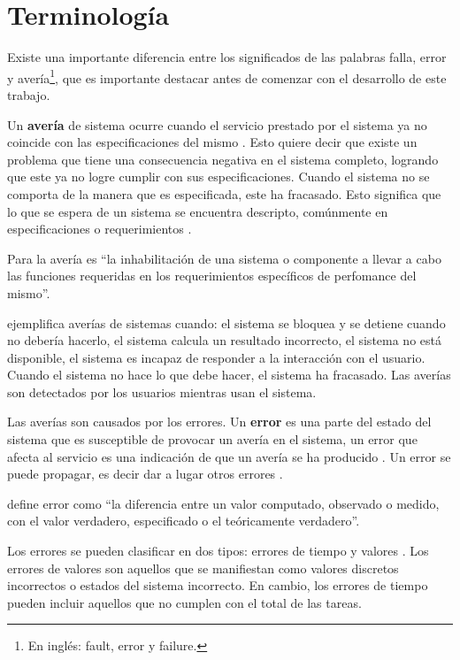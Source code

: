 \section{Terminología}\label{sec:terminologia}
Existe una importante diferencia entre los significados de las palabras falla, error y 
avería\footnote{En inglés: fault, error y failure.}, que es importante destacar antes de comenzar 
con el desarrollo de este trabajo.

Un \textbf{avería} de sistema ocurre cuando el servicio prestado por el sistema ya no coincide con 
las especificaciones del mismo \citep{Hanmer07}. Esto quiere decir que existe un problema que tiene 
una consecuencia negativa en el sistema completo, logrando que este ya no logre cumplir con sus 
especificaciones. Cuando el sistema no se comporta de la manera que es especificada, este ha 
fracasado. Esto significa que lo que se espera de un sistema se encuentra descripto, comúnmente en 
especificaciones o requerimientos \citep{Pullum01}.

Para la \cite{IEEE610.12} avería es ``la inhabilitación de una sistema o componente a llevar a 
cabo las funciones requeridas en los requerimientos específicos de perfomance del mismo''.

\cite{Hanmer07} ejemplifica averías de sistemas cuando: el sistema se bloquea y se detiene cuando no 
debería hacerlo, el sistema calcula un resultado incorrecto, el sistema no está disponible, el 
sistema es incapaz de responder a la interacción con el usuario. Cuando el sistema no hace lo que 
debe hacer, el sistema ha fracasado. Las averías son detectados por los usuarios mientras usan el 
sistema.

Las averías son causados por los errores. Un \textbf{error} es una parte del estado del sistema 
que es susceptible de provocar un avería en el sistema, un error que afecta al servicio es una 
indicación de que un avería se ha producido \citep{Hanmer07}. Un error se puede propagar, es decir 
dar a lugar otros errores \citep{Pullum01}.

\cite{IEEE610.12} define error como ``la diferencia entre un valor computado, observado o medido, 
con el valor verdadero, especificado o el teóricamente verdadero''.

Los errores se pueden clasificar en dos tipos: errores de tiempo y valores \citep{Hanmer07}. Los 
errores de valores son aquellos que se manifiestan como valores discretos incorrectos o estados del 
sistema incorrecto. En cambio, los errores de tiempo pueden incluir aquellos que no cumplen con el total de las tareas.


